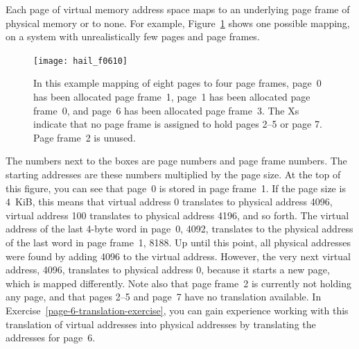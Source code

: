 Each page of virtual memory address space maps to an underlying page
frame of physical memory or to none. For example,
Figure~\ref{example-mapping} shows one possible mapping, on a system
with unrealistically few pages and page frames.
\begin{figure}
\centerline{\texttt{[image: hail\_f0610]}}

\caption{In this example mapping of eight pages to four page frames,
  page~0 has been allocated page frame~1, page~1 has been allocated
  page frame~0, and page~6 has been allocated page frame~3.  The Xs
  indicate that no page frame is assigned to hold pages 2--5 or
  page 7.  Page frame~2 is unused.}
\label{example-mapping}
\end{figure}
The numbers next to the
boxes are page numbers and page frame numbers.  The starting
addresses are these numbers multiplied by the page size.
At the top of this figure, you can see that page~0 is stored in page
frame~1.  If the page size is 4~KiB, this means that virtual address 0
translates to physical address 4096, virtual address 100 translates to
physical address 4196, and so forth.  The virtual address of the last
4-byte word in
page~0, 4092, translates to the physical address of the last word in page frame~1,
8188.  Up until this point, all physical addresses were found by
adding 4096 to the virtual address.  However, the very next virtual
address, 4096, translates to physical address 0, because it starts a
new page, which is mapped differently.  Note also that page frame~2 is
currently not holding any page, and that pages 2--5 and page~7 have no
translation available.  In
Exercise~\ref{page-6-translation-exercise}, you can gain experience working with this
translation of virtual addresses into physical addresses by
translating the addresses for page~6.

